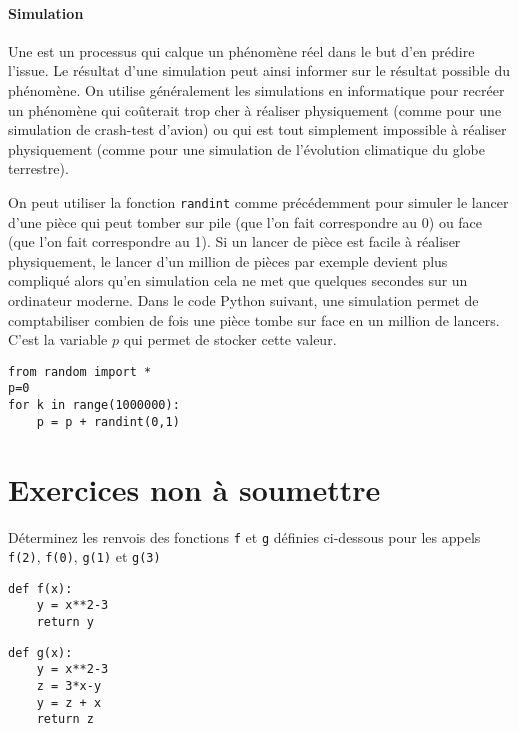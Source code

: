 \subsubsection{Simulation}

Une  est un processus qui calque un phénomène réel dans le but d'en prédire l'issue. Le résultat d'une simulation peut ainsi informer sur le résultat possible du phénomène. On utilise généralement les simulations en informatique pour recréer un phénomène qui coûterait trop cher à réaliser physiquement (comme pour une simulation de crash-test d'avion) ou qui est tout simplement impossible à réaliser physiquement (comme pour une simulation de l'évolution climatique du globe terrestre).

\begin{example}
	On peut utiliser la fonction \texttt{randint} comme précédemment pour simuler le lancer d'une pièce qui peut tomber sur pile (que l'on fait correspondre au 0) ou face (que l'on fait correspondre au 1). Si un lancer de pièce est facile à réaliser physiquement, le lancer d'un million de pièces par exemple devient plus compliqué alors qu'en simulation cela ne met que quelques secondes sur un ordinateur moderne. Dans le code Python suivant, une simulation permet de comptabiliser combien de fois une pièce tombe sur face en un million de lancers. C'est la variable $p$ qui permet de stocker cette valeur.
	\begin{center}
		\begin{varwidth}[t]{.5\textwidth}
			\begin{lstlisting}[language=iPython,linewidth = 7cm]
from random import *
p=0
for k in range(1000000):
    p = p + randint(0,1)\end{lstlisting}\end{varwidth}\end{center}
\end{example}

\chapter*{Exercices non à soumettre}


\begin{exercise}
	Déterminez les renvois des fonctions \texttt{f} et \texttt{g} définies ci-dessous pour les appels \texttt{f(2)}, \texttt{f(0)}, \texttt{g(1)} et \texttt{g(3)}
\begin{center}
	\begin{varwidth}[t]{.5\textwidth}
		\begin{lstlisting}[language=iPython,linewidth = 4cm]
def f(x):
    y = x**2-3
    return y
\end{lstlisting}
\end{varwidth}\hspace{2cm}
	\begin{varwidth}[t]{.5\textwidth}
	\begin{lstlisting}[language=iPython,linewidth = 4cm]
def g(x):
    y = x**2-3
    z = 3*x-y
    y = z + x
    return z
\end{lstlisting}\end{varwidth}
\end{center}
\end{exercise}


